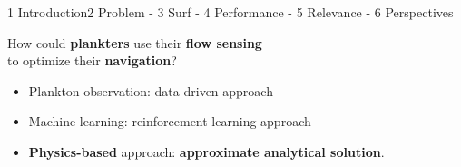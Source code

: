 \begin{frame}{1 Introduction}{2 Problem - 3 Surf - 4 Performance - 5 Relevance - 6 Perspectives}
	\vspace{0pt}
	\begin{center}
		\Large
		How could \textbf{plankters} use their \textbf{flow sensing}\\ to optimize their \textbf{navigation}?
		\pause
		\vspace{10pt}
		\large
		\begin{itemize}
			\item<2-> Plankton observation: data-driven approach
			\item<3-> Machine learning: reinforcement learning approach
		\end{itemize}
	\end{center}
	
	\vspace{0pt}
	\begin{itemize}
		\item<4-> \textbf{Physics-based} approach: \textbf{approximate analytical solution}.
	\end{itemize}
	

\end{frame}
